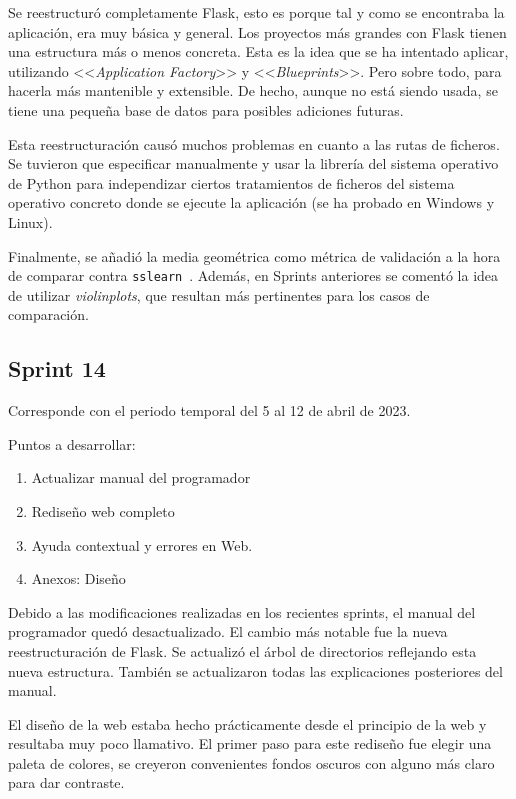 Se reestructuró completamente Flask, esto es porque tal y como se encontraba la
aplicación, era muy básica y general. Los proyectos más grandes con Flask tienen
una estructura más o menos concreta. Esta es la idea que se ha intentado
aplicar, utilizando <<\textit{Application Factory}>> y <<\textit{Blueprints}>>.
Pero sobre todo, para hacerla más mantenible y extensible. De hecho, aunque no
está siendo usada, se tiene una pequeña base de datos para posibles adiciones
futuras. 

Esta reestructuración causó muchos problemas en cuanto a las rutas de ficheros.
Se tuvieron que especificar manualmente y usar la librería del sistema operativo
de Python para independizar ciertos tratamientos de ficheros del sistema
operativo concreto donde se ejecute la aplicación (se ha probado en Windows y
Linux).

Finalmente, se añadió la media geométrica como métrica de validación a la hora
de comparar contra
\texttt{sslearn}~\cite{jose_luis_garrido_labrador_2023_7781117}. Además, en
Sprints anteriores se comentó la idea de utilizar \textit{violinplots}, que
resultan más pertinentes para los casos de comparación.

\subsection{Sprint 14}
Corresponde con el periodo temporal del 5 al 12 de abril de 2023.

Puntos a desarrollar:
\begin{enumerate}
    \item Actualizar manual del programador
    \item Rediseño web completo
    \item Ayuda contextual y errores en Web.
    \item Anexos: Diseño
\end{enumerate}

Debido a las modificaciones realizadas en los recientes sprints, el manual del
programador quedó desactualizado. El cambio más notable fue la nueva
reestructuración de Flask. Se actualizó el árbol de directorios reflejando esta
nueva estructura. También se actualizaron todas las explicaciones posteriores
del manual.

El diseño de la web estaba hecho prácticamente desde el principio de la web y
resultaba muy poco llamativo. El primer paso para este rediseño fue elegir una
paleta de colores, se creyeron convenientes fondos oscuros con alguno más claro
para dar contraste.

